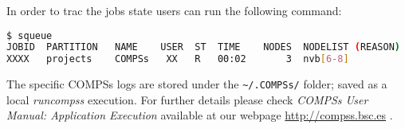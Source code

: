 In order to trac the jobs state users can run the following command:
\begin{lstlisting}[language=bash]
$ squeue
JOBID  PARTITION   NAME    USER  ST  TIME    NODES  NODELIST (REASON)
XXXX   projects    COMPSs   XX   R   00:02       3  nvb[6-8]   
\end{lstlisting}

The specific COMPSs logs are stored under the \verb|~/.COMPSs/| folder; saved as a local \textit{runcompss} execution. For further 
details please check \textit{COMPSs User Manual: Application Execution} available at our webpage \url{http://compss.bsc.es} .
